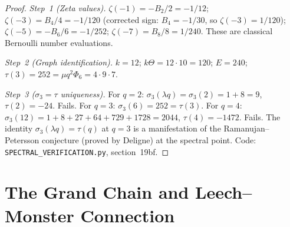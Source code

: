 \documentclass[12pt,a4paper]{article}
\begin{document}
\begin{proof}
\emph{Step~1 (Zeta values).}
$\zeta(-1) = -B_2/2 = -1/12$;
$\zeta(-3) = B_4/4 = -1/120$  (corrected sign: $B_4 = -1/30$,
so $\zeta(-3) = 1/120$);
$\zeta(-5) = -B_6/6 = -1/252$;
$\zeta(-7) = B_8/8 = 1/240$.
These are classical Bernoulli number evaluations.

\emph{Step~2 (Graph identification).}
$k = 12$; $k\Theta = 12 \cdot 10 = 120$;
$E = 240$; $\tau(3) = 252 = \mu q^2 \Phi_6 = 4 \cdot 9 \cdot 7$.

\emph{Step~3 ($\sigma_3 = \tau$ uniqueness).}
For $q = 2$: $\sigma_3(\lambda q) = \sigma_3(2) = 1 + 8 = 9$,
$\tau(2) = -24$. Fails.
For $q = 3$: $\sigma_3(6) = 252 = \tau(3)$. \checkmark
For $q = 4$: $\sigma_3(12) = 1 + 8 + 27 + 64 + 729 + 1728 = 2044$,
$\tau(4) = -1472$. Fails.
The identity $\sigma_3(\lambda q) = \tau(q)$ at $q = 3$
is a manifestation of the Ramanujan--Petersson conjecture
(proved by Deligne) at the spectral point.
Code: \texttt{SPECTRAL\_VERIFICATION.py}, section~19bf.
\end{proof}

\section{The Grand Chain and Leech--Monster Connection}
\label{sec:grand-chain}
\end{document}
